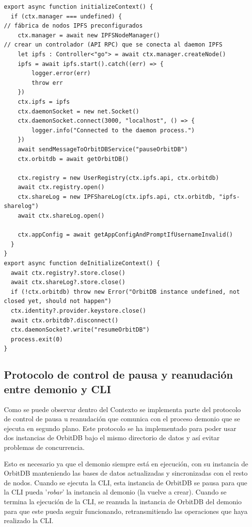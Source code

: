 \begin{verbatim}
export async function initializeContext() {
  if (ctx.manager === undefined) {
// fábrica de nodos IPFS preconfigurados
    ctx.manager = await new IPFSNodeManager()
// crear un controlador (API RPC) que se conecta al daemon IPFS
    let ipfs : Controller<"go"> = await ctx.manager.createNode()
    ipfs = await ipfs.start().catch((err) => {
        logger.error(err)
        throw err
    })
    ctx.ipfs = ipfs
    ctx.daemonSocket = new net.Socket()
    ctx.daemonSocket.connect(3000, "localhost", () => {
        logger.info("Connected to the daemon process.") 
    })
    await sendMessageToOrbitDBService("pauseOrbitDB")
    ctx.orbitdb = await getOrbitDB()
    
    ctx.registry = new UserRegistry(ctx.ipfs.api, ctx.orbitdb)
    await ctx.registry.open()
    ctx.shareLog = new IPFShareLog(ctx.ipfs.api, ctx.orbitdb, "ipfs-sharelog")
    await ctx.shareLog.open()
    
    ctx.appConfig = await getAppConfigAndPromptIfUsernameInvalid()
  }
}
export async function deInitializeContext() {
  await ctx.registry?.store.close()
  await ctx.shareLog?.store.close()
  if (!ctx.orbitdb) throw new Error("OrbitDB instance undefined, not closed yet, should not happen")
  ctx.identity?.provider.keystore.close()
  await ctx.orbitdb?.disconnect()
  ctx.daemonSocket?.write("resumeOrbitDB")
  process.exit(0)
}
\end{verbatim}

\subsection{Protocolo de control de pausa y reanudación entre demonio y CLI}

Como se puede observar dentro del Contexto se implementa parte del protocolo de control de pausa u reanudación
que comunica con el proceso demonio que se ejecuta en segundo plano. Este protocolo se ha implementado
para poder usar dos instancias de OrbitDB bajo el mismo directorio de datos y así evitar problemas de concurrencia.

Esto es necesario ya que el demonio siempre está en ejecución, con su instancia de OrbitDB manteniendo las
bases de datos actualizadas y sincronizadas con el resto de nodos. Cuando se ejecuta la CLI, esta instancia de OrbitDB se pausa para que la CLI pueda
'\textit{robar}' la instancia al demonio (la vuelve a crear). Cuando se termina la ejecución de la CLI, se reanuda la instancia de OrbitDB del demonio para que este pueda seguir funcionando, retransmitiendo las operaciones que haya realizado la CLI.

